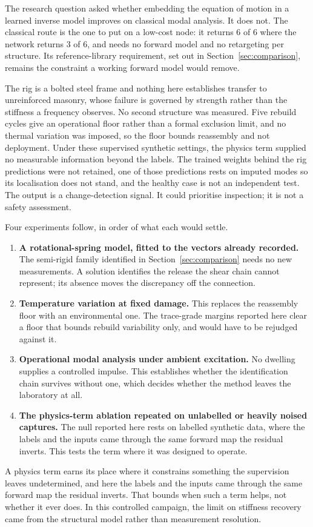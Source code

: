 The research question asked whether embedding the equation of motion in a learned inverse
model improves on classical modal analysis. It does not. The classical route is the one to
put on a low-cost node: it returns 6 of 6 where the network returns 3 of 6, and needs no
forward model and no retargeting per structure. Its reference-library requirement, set out in
Section~\ref{sec:comparison}, remains the constraint a working forward model would remove.

The rig is a bolted steel frame and nothing here establishes transfer to unreinforced
masonry, whose failure is governed by strength rather than the stiffness a frequency
observes. No second structure was measured. Five rebuild cycles give an operational floor
rather than a formal exclusion limit, and no thermal variation was imposed, so the floor
bounds reassembly and not deployment. Under these supervised synthetic settings, the physics
term supplied no measurable information beyond the labels. The trained weights behind the rig
predictions were not retained, one of those predictions rests on imputed modes so its
localisation does not stand, and the healthy case is not an independent test. The output is a
change-detection signal. It could prioritise inspection; it is not a safety assessment.

Four experiments follow, in order of what each would settle.

\begin{enumerate}\itemsep0.3em
\item \textbf{A rotational-spring model, fitted to the vectors already recorded.} The
semi-rigid family identified in Section~\ref{sec:comparison} needs no new measurements. A
solution identifies the release the shear chain cannot represent; its absence moves the
discrepancy off the connection.

\item \textbf{Temperature variation at fixed damage.} This replaces the reassembly floor with
an environmental one. The trace-grade margins reported here clear a floor that bounds rebuild
variability only, and would have to be rejudged against it.

\item \textbf{Operational modal analysis under ambient excitation.} No dwelling supplies a
controlled impulse. This establishes whether the identification chain survives without one,
which decides whether the method leaves the laboratory at all.

\item \textbf{The physics-term ablation repeated on unlabelled or heavily noised captures.}
The null reported here rests on labelled synthetic data, where the labels and the inputs came
through the same forward map the residual inverts. This tests the term where it was designed
to operate.
\end{enumerate}

A physics term earns its place where it constrains something the supervision leaves
undetermined, and here the labels and the inputs came through the same forward map the
residual inverts. That bounds when such a term helps, not whether it ever does. In this
controlled campaign, the limit on stiffness recovery came from the structural model rather
than measurement resolution.
